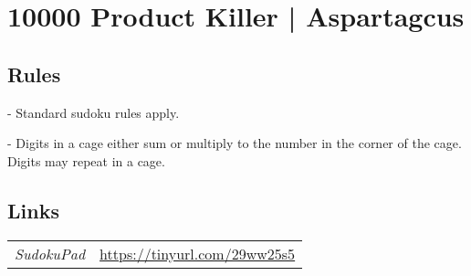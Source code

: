 \section{10000 Product Killer | {\normalfont Aspartagcus}}
\label{sec:53-10000-product-killer-aspartagcus}

\subsection*{Rules}
\begin{markdown}
- Standard sudoku rules apply.

- Digits in a cage either sum or multiply to the number in the corner of the cage. Digits may repeat in a cage.
\end{markdown}
\subsection*{Links}
\begin{tabularx}{\textwidth}{l X}
\emph{SudokuPad} & \url{https://tinyurl.com/29ww25s5} \\
\end{tabularx}
\pagebreak
